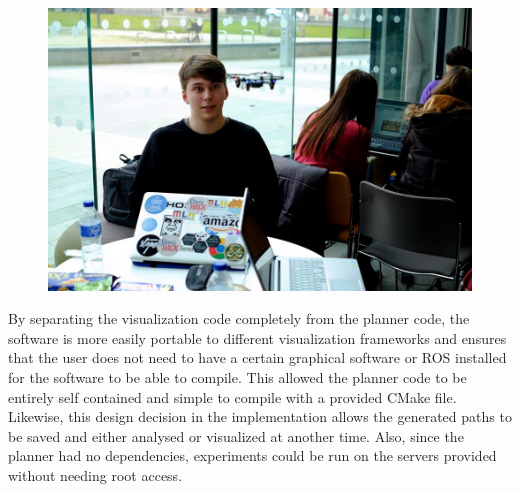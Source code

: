 
\begin{figure}[h!]

    \includegraphics[width=1\linewidth]{figs/filler}

    \caption{}

    \label{fig:software}

\end{figure}

By separating the visualization code completely from the planner code, the
software is more easily portable to different visualization frameworks and
ensures that the user does not need to have a certain graphical software or ROS
installed for the software to be able to compile. This allowed the planner code
to be entirely self contained and simple to compile with a provided CMake file.
Likewise, this design decision in the implementation allows the generated paths
to be saved and either analysed or visualized at another time. Also, since the
planner had no dependencies, experiments could be run on the servers provided
without needing root access.



